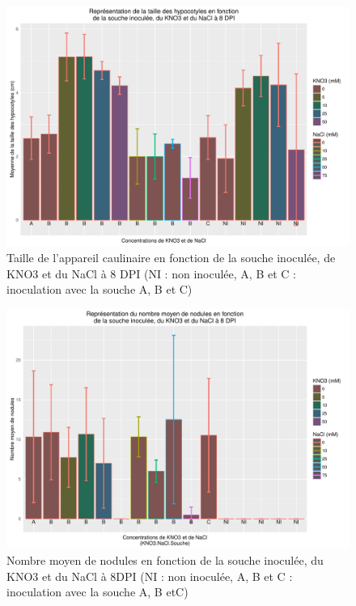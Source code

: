 \documentclass[12pt,a4paper,onecolumn]{article}
\begin{document}
		\newpage

		\begin{figure}[p]
			\begin{center}
				\includegraphics[width=0.9\linewidth]{taille8.pdf}
			\end{center}
			\caption{Taille de l’appareil caulinaire en fonction de la souche inoculée, de KNO3 et du NaCl à 8 DPI (NI : non inoculée, A, B et C : inoculation avec la souche  A, B et C)}
			\label{taille8}
		\end{figure}

		\begin{figure}[p]
			\begin{center}
				\includegraphics[width=0.9\linewidth]{nodmean8.pdf}
			\end{center}
			\caption{Nombre moyen de nodules en fonction de la souche inoculée, du KNO3 et du NaCl à 8DPI (NI : non inoculée, A, B et C : inoculation avec la souche  A, B etC)}
			\label{nodmean8}
		\end{figure}
\end{document}
